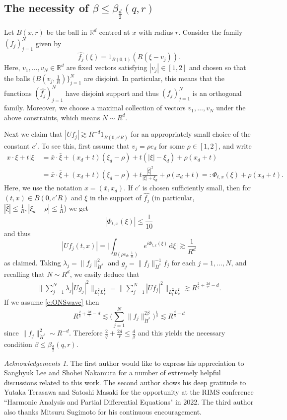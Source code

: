 \documentclass[a4paper]{amsart}
\numberwithin{equation}{section}%
\theoremstyle{plain}%
\theoremstyle{definition}
\theoremstyle{remark}%
\newtheorem*{Acknowledgements}{Acknowledgements}
\begin{document}
\subsection*{The necessity of $\beta \leq \beta_{\frac{d}{2}}(q,r)$}
Let $B(x,r)$ be the ball in $\mathbb{R}^d$ centred at $x$ with radius $r$. Consider the family $(f_j)_{j = 1}^N$ given by 
\[
\widehat{f_j}(\xi) = \mathrm{1}_{B(0,1)}(R(\xi - v_j)).
\]
Here, $v_1,\ldots,v_N \in \mathbb{R}^d$ are fixed vectors satisfying $|v_j| \in [1,2]$ and chosen so that the balls $\{ B(v_j,\frac{1}{R}) \}_{j=1}^N$ are disjoint. In particular, this means that the functions $(\widehat{f_j})_{j = 1}^N$ have disjoint support and thus $(f_j)_{j = 1}^N$ is an orthogonal family. Moreover, we choose a maximal collection of vectors $v_1,\ldots,v_N$ under the above constraints, which means $N \sim R^d$. 

Next we claim that $|Uf_j| \gtrsim R^{-d} 1_{B(0,c'R)}$ for an appropriately small choice of the constant $c'$. To see this, first assume that $v_j = \rho e_d$ for some $\rho \in [1,2]$, and write
\begin{align*}
x \cdot \xi + t|\xi| & = \bar{x} \cdot \bar{\xi} + (x_d + t)(\xi_d - \rho) + t(|\xi| - \xi_d) + \rho(x_d + t) \\
& = \bar{x} \cdot \bar{\xi} + (x_d + t)(\xi_d - \rho) + t\frac{|\bar{\xi}|^2}{|\xi| + \xi_d} + \rho(x_d + t) =: \Phi_{t,x}(\xi) + \rho(x_d + t).
\end{align*}
Here, we use the notation $x = (\bar{x},x_d)$.  If $c'$ is chosen sufficiently small, then for $(t,x) \in B(0,c'R)$ and $\xi$ in the support of $\widehat{f_j}$ (in particular, $|\bar{\xi}| \leq \frac{1}{R}, |\xi_d - \rho| \leq \frac{1}{R}$) we get
\[
|\Phi_{t,x}(\xi)| \leq \frac{1}{10} 
\]
and thus
\[
|Uf_j(t,x)| =  \bigg|\int_{B(\rho e_d,\frac{1}{R})} e^{i\Phi_{t,x}(\xi)} \, \mathrm{d}\xi  \bigg| \gtrsim \frac{1}{R^d}
\]
as claimed. Taking $\lambda_j = \|f_j\|_{\dot{H}^s}^2$ and $g_j =\|f_j\|^{-1}_{\dot{H}^s} f_j$ for each $j = 1,\ldots,N$, and recalling that $N \sim R^d$, we easily deduce that
\begin{align*}
\bigg\| \sum_{j=1}^N \lambda_j |Ug_j|^2 \bigg\|_{L^{\frac{q}{2}}_tL^{\frac{r}{2}}_x} = \bigg\| \sum_{j=1}^N |Uf_j|^2 \bigg\|_{L^{\frac{q}{2}}_tL^{\frac{r}{2}}_x}  \gtrsim R^{\frac{2}{q} + \frac{2d}{r}-d}.
\end{align*}
If we assume \eqref{e:ONSwave} then 
\[
R^{\frac{2}{q} + \frac{2d}{r}-d} \lesssim \bigg(\sum_{j=1}^N \|f_j\|_{\dot{H}^s}^{2\beta}  \bigg)^{\frac{1}{\beta}} \lesssim R^{\frac{d}{\beta} - d}
\]
since $ \|f_j\|_{\dot{H}^s}^2 \sim R^{-d}$. Therefore $\frac{2}{q} + \frac{2d}{r} \leq \frac{d}{\beta}$ and this yields the necessary condition $\beta \leq \beta_{\frac{d}{2}}(q,r)$.
\begin{Acknowledgements}
The first author would like to express his appreciation to Sanghyuk Lee and Shohei Nakamura for a number of extremely helpful discussions related to this work. The second author shows his deep gratitude to Yutaka Terasawa and Satoshi Masaki for the opportunity at the RIMS conference ``Harmonic Analysis and Partial Differential Equations" in 2022.
The third author also thanks Mitsuru Sugimoto for his continuous encouragement. 
\end{Acknowledgements}
\end{document}
